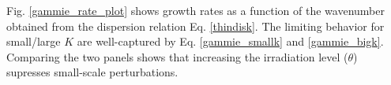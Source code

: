 

Fig. \ref{gammie_rate_plot} shows growth rates as a function of the
wavenumber obtained from the dispersion relation 
Eq. \ref{thindisk}. The limiting behavior for small/large $K$ are
well-captured by Eq. \ref{gammie_smallk} and
\ref{gammie_bigk}. Comparing the two panels 
shows that increasing the
irradiation level ($\theta$) supresses small-scale
perturbations. %



